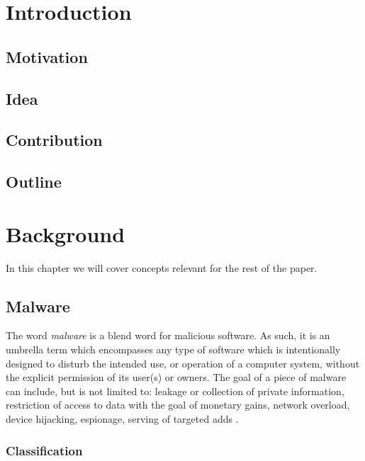 \chapter{Introduction}

\section{Motivation}

\section{Idea}

\section{Contribution}

\section{Outline}

\chapter{Background}



In this chapter we will cover concepts relevant for the rest of the paper. %

\section{Malware}

The word \emph{malware} is a blend word for malicious software. As such, it is an umbrella term which encompasses any type of software which is intentionally designed to disturb the intended use, or operation of a computer system, without the explicit permission of its user(s) or owners. The goal of a piece of malware can include, but is not limited to: leakage or collection of private information, restriction of access to data with the goal of monetary gains, network overload, device hijacking, espionage, serving of targeted adds \cite{wiki_malware}.

\subsection{Classification}

